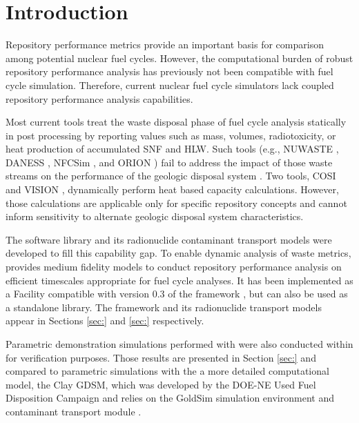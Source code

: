 \section{Introduction}\label{sec:introduction}
Repository performance metrics provide an important basis for comparison among
potential nuclear fuel cycles.
However, the computational
burden of robust repository performance analysis has previously not been
compatible with fuel cycle simulation.
Therefore, current nuclear fuel cycle simulators
lack coupled repository performance analysis capabilities.

Most current tools treat the waste disposal
phase of fuel cycle analysis statically in post processing by reporting
values such as mass, volumes, radiotoxicity, or heat production of accumulated
\gls{SNF} and \gls{HLW}. Such tools
(e.g.,
\gls{NUWASTE} \cite{abkowitz_nuclear_2010},
\gls{DANESS} \cite{van_den_durpel_daness:_2006},
\gls{NFCSim} \cite{schneider_nfcsim_2004}, and
ORION \cite{gregg_orion_2011})
fail to address the impact of those waste streams on the performance of the
geologic disposal system \cite{wilson_comparing_2011}.  Two tools, \gls{COSI}
\cite{boucher_international_2010} and \gls{VISION} \cite{yacout_vision_2006,
wilson_comparing_2011, radel_repository_2007, boucher_international_2010},
dynamically perform heat based capacity calculations.
However, those calculations are applicable only for specific
repository concepts and cannot inform sensitivity to alternate geologic disposal
system characteristics.

The \Cyder software library \cite{huff_cyder_2013} and its radionuclide
contaminant transport models were  developed to fill this capability gap.  To
enable dynamic analysis of waste metrics, \Cyder provides medium fidelity
models to conduct repository performance analysis on efficient timescales
appropriate for fuel cycle analyses. It has been implemented as a Facility
compatible with version 0.3 of the \Cyclus framework \cite{wilson_cyclus:_2012}, but can
also be used as a standalone library.
The \Cyder framework and its radionuclide transport models appear in Sections
\ref{sec:} and \ref{sec:} respectively.

Parametric demonstration simulations performed with \Cyder were also conducted
within \Cyclus for verification purposes. Those results are presented in
Section \ref{sec:} and compared to parametric simulations with the a more
detailed computational model, the Clay \gls{GDSM}, which was developed by the
DOE-NE Used Fuel Disposition Campaign \cite{clayton_generic_2011} and relies on
the GoldSim simulation environment \cite{golder_associates_goldsim_2010-1} and
contaminant transport module \cite{golder_associates_goldsim_2010-1}.

